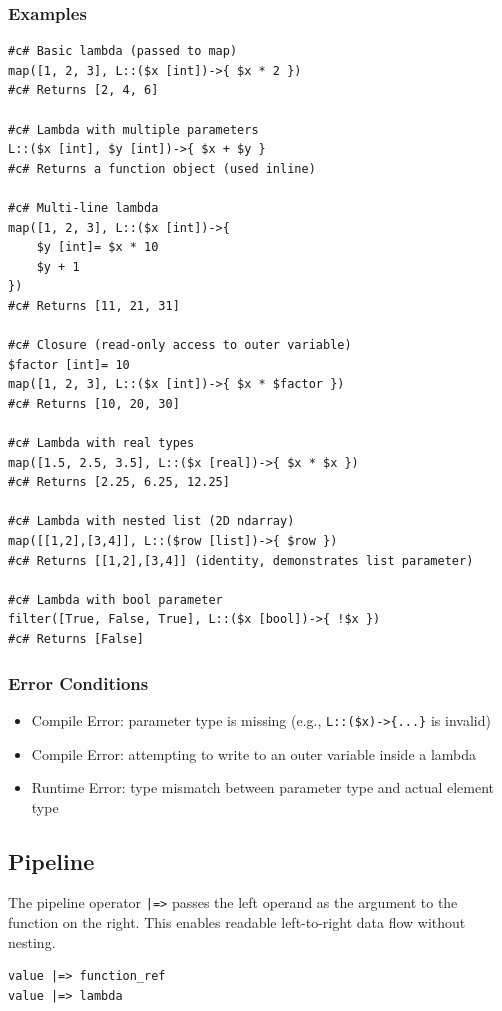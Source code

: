 \subsubsection{Examples}
\begin{verbatim}
#c# Basic lambda (passed to map)
map([1, 2, 3], L::($x [int])->{ $x * 2 })
#c# Returns [2, 4, 6]

#c# Lambda with multiple parameters
L::($x [int], $y [int])->{ $x + $y }
#c# Returns a function object (used inline)

#c# Multi-line lambda
map([1, 2, 3], L::($x [int])->{
    $y [int]= $x * 10
    $y + 1
})
#c# Returns [11, 21, 31]

#c# Closure (read-only access to outer variable)
$factor [int]= 10
map([1, 2, 3], L::($x [int])->{ $x * $factor })
#c# Returns [10, 20, 30]

#c# Lambda with real types
map([1.5, 2.5, 3.5], L::($x [real])->{ $x * $x })
#c# Returns [2.25, 6.25, 12.25]

#c# Lambda with nested list (2D ndarray)
map([[1,2],[3,4]], L::($row [list])->{ $row })
#c# Returns [[1,2],[3,4]] (identity, demonstrates list parameter)

#c# Lambda with bool parameter
filter([True, False, True], L::($x [bool])->{ !$x })
#c# Returns [False]
\end{verbatim}

\subsubsection{Error Conditions}
\begin{itemize}
\item Compile Error: parameter type is missing (e.g., \texttt{L::(\$x)->\{...\}} is invalid)
\item Compile Error: attempting to write to an outer variable inside a lambda
\item Runtime Error: type mismatch between parameter type and actual element type
\end{itemize}

\subsection{Pipeline}
The pipeline operator \texttt{|=>} passes the left operand as the argument to the function on the right. This enables readable left-to-right data flow without nesting.
\begin{verbatim}
value |=> function_ref
value |=> lambda
\end{verbatim}


